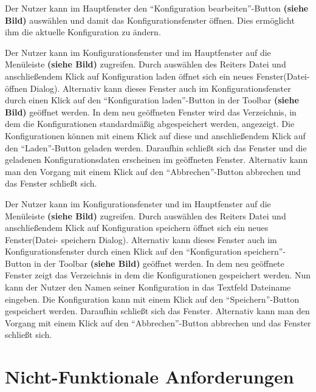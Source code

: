 \documentclass[parskip=full,11pt]{scrartcl}
\begin{document}

Der Nutzer kann im Hauptfenster den \enquote{Konfiguration bearbeiten}-Button \textbf{(siehe Bild)} auswählen und damit das Konfigurationsfenster öffnen. Dies ermöglicht ihm die aktuelle Konfiguration zu ändern.


Der Nutzer kann im Konfigurationsfenster und im Hauptfenster auf die Menüleiste \textbf{(siehe Bild)} zugreifen. Durch auswählen des Reiters Datei und anschließendem Klick auf Konfiguration laden öffnet sich ein neues Fenster(Datei-öffnen Dialog). Alternativ kann dieses Fenster auch im Konfigurationsfenster durch einen Klick auf den \enquote{Konfiguration laden}-Button in der Toolbar \textbf{(siehe Bild)} geöffnet werden. In dem neu geöffneten Fenster wird das Verzeichnis, in dem die Konfigurationen standardmäßig abgespeichert werden, angezeigt. Die Konfigurationen können mit einem Klick auf diese und anschließendem Klick auf den \enquote{Laden}-Button geladen werden. Daraufhin schließt sich das Fenster und die geladenen Konfigurationsdaten erscheinen im geöffneten Fenster. Alternativ kann man den Vorgang mit einem Klick auf den \enquote{Abbrechen}-Button abbrechen und das Fenster schließt sich.


Der Nutzer kann im Konfigurationsfenster und im Hauptfenster auf die Menüleiste \textbf{(siehe Bild)} zugreifen. Durch auswählen des Reiters Datei und anschließendem Klick auf Konfiguration speichern öffnet sich ein neues Fenster(Datei- speichern Dialog). Alternativ kann dieses Fenster auch im Konfigurationsfenster durch einen Klick auf den \enquote{Konfiguration speichern}-Button in der Toolbar \textbf{(siehe Bild)} geöffnet werden. In dem neu geöffnete Fenster zeigt das Verzeichnis in dem die Konfigurationen gespeichert werden. Nun kann der Nutzer den Namen seiner Konfiguration in das Textfeld Dateiname eingeben. Die Konfiguration kann mit einem Klick auf den \enquote{Speichern}-Button gespeichert werden. Daraufhin schließt sich das Fenster. Alternativ kann man den Vorgang mit einem Klick auf den \enquote{Abbrechen}-Button abbrechen und das Fenster schließt sich.

\section{Nicht-Funktionale Anforderungen}
\end{document}
